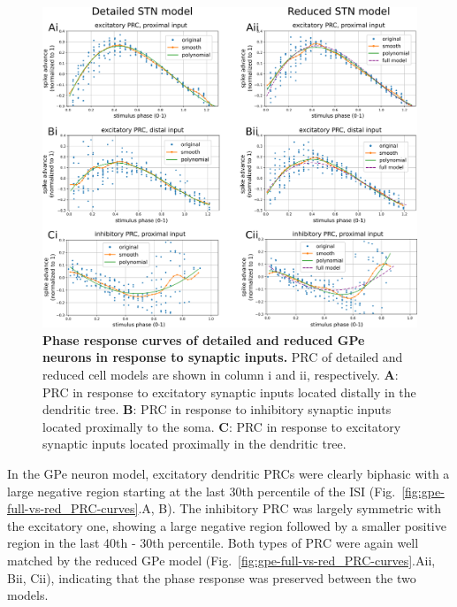 \begin{figure}[ht]
\centering
\includegraphics[width=\textwidth]{ch_reduced_model/figs/fig_stn-full-vs-red_PRC-curves.png}
\caption{\textbf{Phase response curves of detailed and reduced GPe neurons in response to synaptic inputs.}
PRC of detailed and reduced cell models are shown in column i and ii, respectively.
\textbf{A}: PRC in response to excitatory synaptic inputs located distally in the dendritic tree.
\textbf{B}: PRC in response to inhibitory synaptic inputs located proximally to the soma.
\textbf{C}: PRC in response to excitatory synaptic inputs located proximally in the dendritic tree.}
\label{fig:stn-full-vs-red_PRC-curves}
\end{figure}

%
%

In the GPe neuron model, excitatory dendritic PRCs were clearly biphasic with a large
negative region starting at the last 30th percentile of the ISI
(Fig.~\ref{fig:gpe-full-vs-red_PRC-curves}.A, B).
The inhibitory PRC was largely symmetric with the excitatory one, showing a large negative
region followed by a smaller positive region in the last 40th - 30th percentile.
Both types of PRC were again well matched by the reduced GPe model (Fig.~\ref{fig:gpe-full-vs-red_PRC-curves}.Aii, Bii, Cii),
indicating that the phase response was preserved between the two models.

